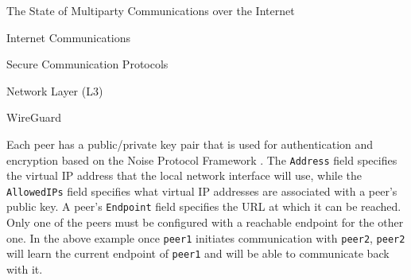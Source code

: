 \begin{frame}[fragile]{The State of Multiparty Communications over the
Internet}
\begin{block}{Internet Communications}
\begin{block}{Secure Communication Protocols}
\begin{block}{Network Layer (L3)}
\begin{block}{WireGuard}
\begin{Shaded}
\begin{Highlighting}[]
\KeywordTok{[Peer]}
\OtherTok{=}
\OtherTok{=}
\OtherTok{=}
\end{Highlighting}
\end{Shaded}

\begin{Shaded}
\begin{Highlighting}[]
\KeywordTok{[Interface]}
\OtherTok{=}
\OtherTok{=}\StringTok{ }
\OtherTok{=}

\KeywordTok{[Peer]}
\OtherTok{=}
\OtherTok{=}
\end{Highlighting}
\end{Shaded}

Each peer has a public/private key pair that is used for authentication
and encryption based on the Noise Protocol Framework
\autocite{noiseDocs}. The \texttt{Address} field specifies the virtual
IP address that the local network interface will use, while the
\texttt{AllowedIPs} field specifies what virtual IP addresses are
associated with a peer's public key. A peer's \texttt{Endpoint} field
specifies the URL at which it can be reached. Only one of the peers must
be configured with a reachable endpoint for the other one. In the above
example once \texttt{peer1} initiates communication with \texttt{peer2},
\texttt{peer2} will learn the current endpoint of \texttt{peer1} and
will be able to communicate back with it.

\end{block}
\end{block}
\end{block}


\end{block}
\end{frame}
